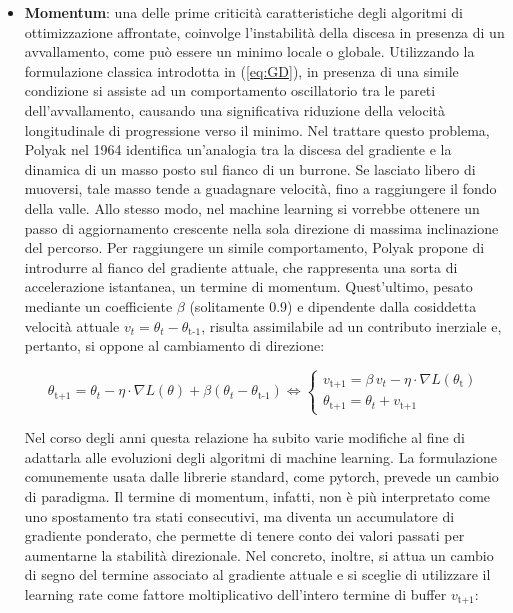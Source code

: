     \begin{itemize}

        \item \textbf{Momentum}: una delle prime criticità caratteristiche degli algoritmi di ottimizzazione affrontate, coinvolge l'instabilità della discesa in presenza di un avvallamento, come può essere un minimo locale o globale. Utilizzando la formulazione classica introdotta in (\ref{eq:GD}), in presenza di una simile condizione si assiste ad un comportamento oscillatorio tra le pareti dell'avvallamento, causando una significativa riduzione della velocità longitudinale di progressione verso il minimo. Nel trattare questo problema, Polyak\cite{Momentum} nel 1964 identifica un'analogia tra la discesa del gradiente e la dinamica di un masso posto sul fianco di un burrone. Se lasciato libero di muoversi, tale masso tende a guadagnare velocità, fino a raggiungere il fondo della valle. Allo stesso modo, nel machine learning si vorrebbe ottenere un passo di aggiornamento crescente nella sola direzione di massima inclinazione del percorso. Per raggiungere un simile comportamento, Polyak propone di introdurre al fianco del gradiente attuale, che rappresenta una sorta di accelerazione istantanea, un termine di momentum. Quest'ultimo, pesato mediante un coefficiente $\beta$ (solitamente 0.9) e dipendente dalla cosiddetta velocità attuale $v_{t} = \theta_{t} - \theta_{\text{t-1}}$, risulta assimilabile ad un contributo inerziale e, pertanto, si oppone al cambiamento di direzione:
        
            \begin{equation}
                \theta_{\text{t+1}} = \theta_{t} - \eta \cdot \nabla L(\theta) + \beta (\theta_{t} - \theta_{\text{t-1}}) \iff \begin{cases}
                    v_{\text{t+1}} = \beta \, v_{t} - \eta \cdot \nabla L(\theta_{\text{t}}) \\[0.35cm]
                    \theta_{\text{t+1}} = \theta_{t} + v_{\text{t+1}}
                \end{cases}
                \label{eq:Polyak}
            \end{equation}

        Nel corso degli anni questa relazione ha subito varie modifiche al fine di adattarla alle evoluzioni degli algoritmi di machine learning. La formulazione comunemente usata dalle librerie standard, come pytorch\cite{Momentum_pytorch}, prevede un cambio di paradigma. Il termine di momentum, infatti, non è più interpretato come uno spostamento tra stati consecutivi, ma diventa un accumulatore di gradiente ponderato, che permette di tenere conto dei valori passati per aumentarne la stabilità direzionale. Nel concreto, inoltre, si attua un cambio di segno del termine associato al gradiente attuale e si sceglie di utilizzare il learning rate come fattore moltiplicativo dell'intero termine di buffer $v_{\text{t+1}}$:


\end{itemize}
